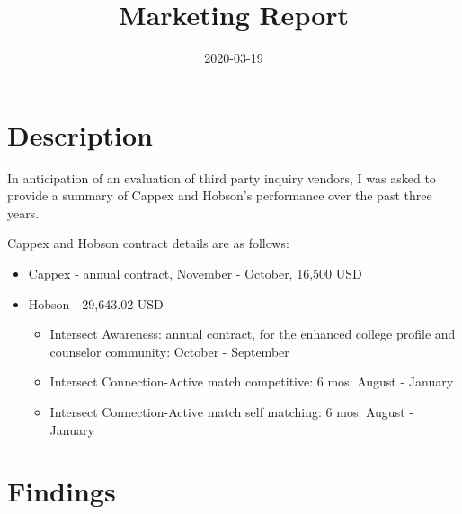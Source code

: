 \documentclass[]{tufte-handout}
\title{Marketing Report}
\date{2020-03-19}
\begin{document}
\maketitle




\hypertarget{description}{%
\section{Description}\label{description}}

In anticipation of an evaluation of third party inquiry vendors, I was
asked to provide a summary of Cappex and Hobson's performance over the
past three years.

Cappex and Hobson contract details are as follows:

\begin{itemize}
\item
  Cappex - annual contract, November - October, 16,500 USD
\item
  Hobson - 29,643.02 USD

  \begin{itemize}
  \item
    Intersect Awareness: annual contract, for the enhanced college
    profile and counselor community: October - September
  \item
    Intersect Connection-Active match competitive: 6 mos: August -
    January
  \item
    Intersect Connection-Active match self matching: 6 mos: August -
    January
  \end{itemize}
\end{itemize}

\hypertarget{findings}{%
\section{Findings}\label{findings}}
\end{document}
